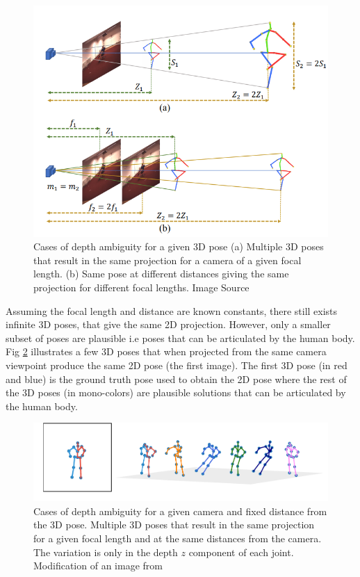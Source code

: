 \begin{figure}[h]
    \centering
    \includegraphics[width=\textwidth]{figures/background/depthambi.png}
    \caption{Cases of depth ambiguity for a given 3D pose (a) Multiple 3D poses that result in the same projection for a camera of a given focal length. (b) Same pose at different distances giving the same projection for different focal lengths.
    Image Source \cite{poselifter}}

    \label{fig:depth_ambiguity_case1}
\end{figure}

Assuming the focal length and distance are known constants, there still exists infinite 3D poses, that give the same 2D projection. However, only a smaller subset of poses are plausible i.e poses that can be articulated by the human body. Fig \ref{fig:depth_ambiguity_case2} illustrates a few 3D poses that when projected from the same camera viewpoint produce the same 2D pose (the first image). The first 3D pose (in red and blue) is the ground truth pose used to obtain the 2D pose where the rest of the 3D poses (in mono-colors) are plausible solutions that can be articulated by the human body. 

\begin{figure}[h]
    \centering
    \includegraphics[width=\textwidth]{figures/h36_viz/multiple3d_per_2d.pdf}
    \caption{Cases of depth ambiguity for a given camera and fixed distance from the 3D pose. Multiple 3D poses that result in the same projection for a given focal length and at the same distances from the camera. The variation is only in the depth $z$ component of each joint. Modification of an image from \cite{poselifter}}

    \label{fig:depth_ambiguity_case2}
\end{figure}


